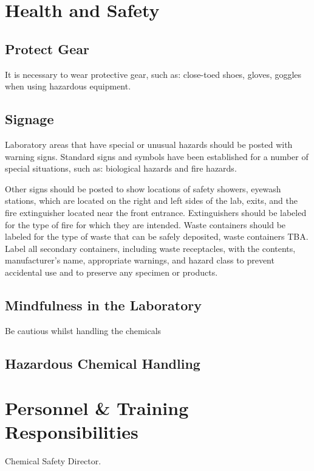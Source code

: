 \documentclass[12pt]{../SOP2}
\begin{document}
\section{Health and Safety}

\subsection{Protect Gear}

It is necessary to wear protective gear, such as: close-toed shoes, gloves, goggles when using hazardous equipment.

\subsection{Signage}

\NP Laboratory areas that have special or unusual hazards should be posted with warning signs. Standard signs and symbols have been established for a number of special situations, such as: biological hazards and fire hazards.

\NP Other signs should be posted to show locations of safety showers, eyewash stations, which are located on the right and left sides of the lab, exits, and the fire extinguisher located near the front entrance. Extinguishers should be labeled for the type of fire for which they are intended. Waste containers should be labeled for the type of waste that can be safely deposited, waste containers TBA. Label all secondary containers, including waste receptacles, with the contents, manufacturer’s name, appropriate warnings, and hazard class to prevent accidental use and to preserve any specimen or products. 

\subsection{Mindfulness in the Laboratory}

Be cautious whilst handling the chemicals

\subsection{Hazardous Chemical Handling}

\section{Personnel \& Training Responsibilities}

\NP Chemical Safety Director.
\end{document}

